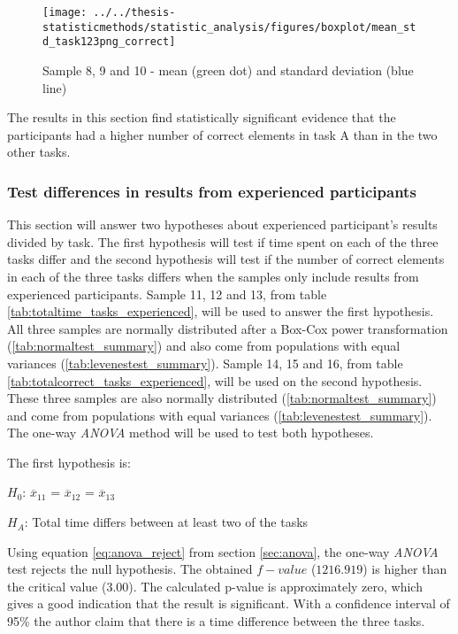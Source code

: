 \begin{figure}[H]
	\centering
	\texttt{[image: ../../thesis-statisticmethods/statistic\_analysis/figures/boxplot/mean\_std\_task123png\_correct]}
	\caption{Sample 8, 9 and 10 - mean (green dot) and standard deviation (blue line)}
	\label{fig:meanstdtask123pngcorrect}
\end{figure}

\vspace{0.3cm}

The results in this section find statistically significant evidence that the participants had a higher number of correct elements in task A than in the two other tasks.

\subsubsection[Sample 11 - 16]{Test differences in results from experienced participants}\label{sec:sample_11_12_13_anova}
This section will answer two hypotheses about experienced participant's results divided by task. The first hypothesis will test if time spent on each of the three tasks differ and the second hypothesis will test if the number of correct elements in each of the three tasks differs when the samples only include results from experienced participants. Sample 11, 12 and 13, from table \ref{tab:totaltime_tasks_experienced}, will be used to answer the first hypothesis. All three samples are normally distributed after a Box-Cox power transformation (\ref{tab:normaltest_summary}) and also come from populations with equal variances (\ref{tab:levenestest_summary}). Sample 14, 15 and 16, from table \ref{tab:totalcorrect_tasks_experienced}, will be used on the second hypothesis. These three samples are also normally distributed (\ref{tab:normaltest_summary}) and come from populations with equal variances (\ref{tab:levenestest_summary}). The one-way \textit{ANOVA} method will be used to test both hypotheses. 

The first hypothesis is:\\
\centerline{$H_{0}$: $\overline{x}_{11}$ = $\overline{x}_{12}$ = $\overline{x}_{13}$}
\centerline{$H_{A}$: Total time differs between at least two of the tasks}
\vspace{0.2cm}

Using equation \ref{eq:anova_reject}  from section \ref{sec:anova}, the one-way \textit{ANOVA} test rejects the null hypothesis. The obtained $f-value$ ($1216.919$) is higher than the critical value ($3.00$). The calculated p-value is approximately zero, which gives a good indication that the result is significant. With a confidence interval of 95\% the author claim that there is a time difference between the three tasks. 

